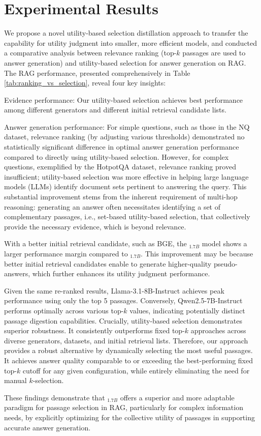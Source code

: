 \section{Experimental Results}
We propose a novel utility-based selection distillation approach to transfer the capability for utility judgment into smaller, more efficient models,  and conducted a comparative analysis between relevance ranking (top-$k$ passages are used to answer generation) and utility-based selection for answer generation on RAG. 
The RAG performance, presented comprehensively in Table \ref{tab:ranking_vs_selection}, reveal four key insights:
\begin{enumerate*}[label=(\roman*)]
\item Evidence performance:  Our utility-based selection achieves best performance among different generators and different initial retrieval candidate lists. 
\item Answer generation performance:  For simple questions, such as those in the NQ dataset, relevance ranking (by adjusting various thresholds) demonstrated no statistically significant difference in optimal answer generation performance compared to directly using utility-based selection. However, for complex questions, exemplified by the HotpotQA dataset, relevance ranking proved insufficient; utility-based selection was more effective in helping large language models (LLMs) identify document sets pertinent to answering the query. This substantial improvement stems from the inherent requirement of multi-hop reasoning: generating an answer often necessitates identifying a set of complementary passages, i.e., set-based utility-based selection, that collectively provide the necessary evidence, which is beyond relevance. 
\item With a better initial retrieval candidate, such as BGE, the \utility$_{1.7B}$ model shows a larger performance margin compared to \rank$_{1.7B}$. This improvement may be because better initial retrieval candidates enable \utility to generate higher-quality pseudo-answers, which further enhances its utility judgment performance. 
\item Given the same re-ranked results, Llama-3.1-8B-Instruct achieves peak performance using only the top 5 passages. Conversely, Qwen2.5-7B-Instruct performs optimally across various top-$k$ values, indicating potentially distinct passage digestion capabilities. 
Crucially, utility-based selection demonstrates superior robustness. 
It consistently outperforms fixed top-$k$ approaches across diverse generators, datasets, and initial retrieval lists. 
Therefore, our approach provides a robust alternative by dynamically selecting the most useful passages. It achieves answer quality comparable to or exceeding the best-performing fixed top-$k$ cutoff for any given configuration, while entirely eliminating the need for manual $k$-selection. 
\end{enumerate*}
These findings demonstrate that \utility$_{1.7B}$ offers a superior and more adaptable paradigm for passage selection in RAG, particularly for complex information needs, by explicitly optimizing for the collective utility of passages in supporting accurate answer generation.



